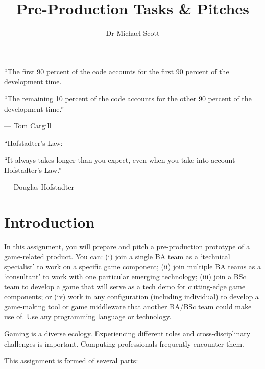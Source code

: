 \documentclass{../fal_assignment}
\title{Pre-Production Tasks \& Pitches}
\author{Dr Michael Scott}
\begin{document}
\maketitle

\begin{marginquote}
    ``The first 90 percent of the code accounts for the first 90 percent of the development time.
    
    ``The remaining 10 percent of the code accounts for the other 90 percent of the development time.''
    
    --- Tom Cargill
    
    \marginquoterule
    
    ``Hofstadter's Law:
    
    ``It always takes longer than you expect, even when you take into account Hofstadter's Law.''
    
    --- Douglas Hofstadter
\end{marginquote}

\section*{Introduction}

In this assignment, you will prepare and pitch a pre-production prototype of a game-related product. You can: (i) join a single BA team as a `technical specialist' to work on a specific game component; (ii) join multiple BA teams as a `consultant' to work with one particular emerging technology; (iii) join a BSc team to develop a game that will serve as a tech demo for cutting-edge game components; or (iv) work in any configuration (including individual) to develop a game-making tool or game middleware that another BA/BSc team could make use of. Use any programming language or technology.

Gaming is a diverse ecology. Experiencing different roles and cross-disciplinary challenges is important. Computing professionals frequently encounter them.

This assignment is formed of several parts:
\end{document}
